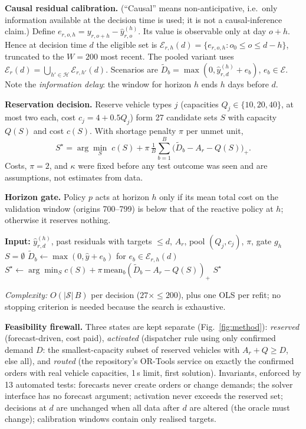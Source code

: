 \documentclass[conference]{IEEEtran}
\begin{document}
\textbf{Causal residual calibration.} (``Causal'' means non-anticipative, i.e.\ only information available at the decision time is used; it is not a causal-inference claim.) Define $e_{r,o,h}=y_{r,o+h}-\hat y^{(h)}_{r,o}$. Its value is observable only at day $o{+}h$. Hence at decision time $d$ the eligible set is $\mathcal E_{r,h}(d)=\{e_{r,o,h}: o_0\le o\le d-h\}$, truncated to the $W{=}200$ most recent. The pooled variant uses $\mathcal E_r(d)=\bigcup_{h'\in\mathcal H}\mathcal E_{r,h'}(d)$. Scenarios are $\tilde D_b=\max(0,\hat y^{(h)}_{r,d}+e_b)$, $e_b\in\mathcal E$. Note the \emph{information delay}: the window for horizon $h$ ends $h$ days before $d$.

\textbf{Reservation decision.} Reserve vehicle types $j$ (capacities $Q_j\in\{10,20,40\}$, at most two each, cost $c_j=4+0.5Q_j$) form 27 candidate sets $S$ with capacity $Q(S)$ and cost $c(S)$. With shortage penalty $\pi$ per unmet unit,
\begin{equation}
S^\star=\arg\min_{S}\; c(S)+\pi\,\tfrac1B\sum_{b=1}^{B}\big(\tilde D_b-A_r-Q(S)\big)_+ .
\label{eq:obj}
\end{equation}
Costs, $\pi{=}2$, and $\kappa$ were fixed before any test outcome was seen and are assumptions, not estimates from data.

\textbf{Horizon gate.} Policy $p$ acts at horizon $h$ only if its mean total cost on the validation window (origins 700--799) is below that of the reactive policy at $h$; otherwise it reserves nothing.

\begin{algorithm}[t]\caption{HCCR reserve decision at origin $d$ (reservation state only)}\label{alg:hccr}
\begin{algorithmic}[1]
\STATE \textbf{Input:} $\hat y^{(h)}_{r,d}$, past residuals with targets $\le d$, $A_r$, pool $(Q_j,c_j)$, $\pi$, gate $g_h$
 \RETURN $S=\emptyset$ \ENDIF
\STATE $\tilde D_b\gets\max(0,\hat y+e_b)$ for $e_b\in\mathcal E_{r,h}(d)$
\STATE $S^\star\gets\arg\min_S c(S)+\pi\,\mathrm{mean}_b(\tilde D_b-A_r-Q(S))_+$ 
\RETURN $S^\star$ 
\end{algorithmic}\end{algorithm}
\emph{Complexity:} $O(|\mathcal S|\,B)$ per decision ($27\times\le200$), plus one OLS per refit; no stopping criterion is needed because the search is exhaustive.

\textbf{Feasibility firewall.} Three states are kept separate (Fig.~\ref{fig:method}): \emph{reserved} (forecast-driven, cost paid), \emph{activated} (dispatcher rule using only confirmed demand $D$: the smallest-capacity subset of reserved vehicles with $A_r+Q\ge D$, else all), and \emph{routed} (the repository's OR-Tools service on exactly the confirmed orders with real vehicle capacities, 1\,s limit, first solution). Invariants, enforced by 13 automated tests: forecasts never create orders or change demands; the solver interface has no forecast argument; activation never exceeds the reserved set; decisions at $d$ are unchanged when all data after $d$ are altered (the oracle must change); calibration windows contain only realised targets.
\end{document}
